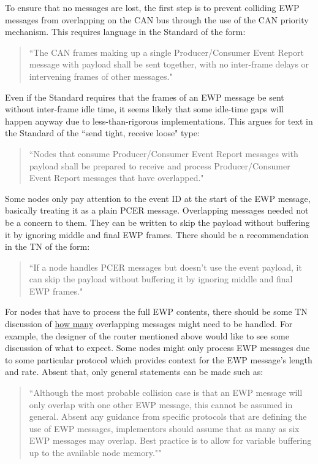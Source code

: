\documentclass[11pt]{article}
\begin{document}
To ensure that no messages are lost,
the first step is to prevent
colliding EWP messages from overlapping on the 
CAN bus through the use of the CAN priority mechanism.  
This requires language in the Standard of the form:
\begin{quote}
    ``The CAN frames making up a single Producer/Consumer Event Report message with payload 
    shall be sent together, with no inter-frame delays 
    or intervening frames of other messages."
\end{quote}

Even if the Standard requires that the frames of an EWP message
be sent without inter-frame idle time, it seems likely that 
some idle-time gaps will happen
anyway due to less-than-rigorous implementations.  
This argues for text in the Standard of the ``send tight, receive loose" type:
\cbstart
\begin{quote}
    ``Nodes that consume Producer/Consumer Event Report messages with payload
    shall be prepared to receive and process Producer/Consumer Event Report messages
    that have overlapped."
\end{quote}
\cbend

Some nodes only pay attention to the event ID at the start of the EWP message, basically
treating it as a plain PCER message.  
Overlapping messages needed not be a concern to them.
They can be written to 
skip the payload without buffering it by ignoring middle and final EWP frames.
There should be a recommendation in the TN of the form:
\begin{quote}
    ``If a node handles PCER messages but doesn't use the event payload, 
    it can skip the payload without buffering it by ignoring middle and final EWP frames."
\end{quote}

For nodes that have to process the full EWP contents, there should be some TN discussion of
\underline{how many}
overlapping messages might need to be handled.
For example, the designer of the router mentioned above would like to see some 
discussion of what to expect.  
Some nodes might only process EWP messages due to some particular protocol
which provides context for the EWP message's length and rate.  
Absent that, only general statements can be made such as:
\begin{quote}
    ``Although the most probable collision case is that an EWP message will only overlap
    with one other EWP message, this cannot be assumed in general.
    Absent any guidance from specific protocols that are defining the 
    use of EWP messages, implementors should assume that as many as
    six EWP messages may overlap. Best practice is to allow for variable
    buffering up to the available node memory.""
\end{quote}
\end{document}
